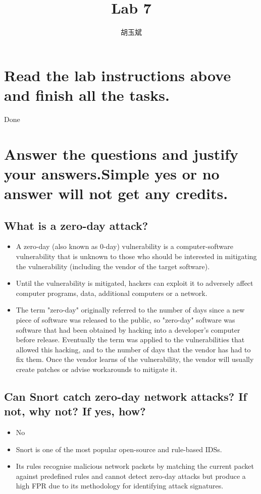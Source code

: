 \documentclass[onecolumn,oneside]{SUSTechHomework}
\author{胡玉斌}
\title{Lab 7}
\begin{document}
  \maketitle

  \section{Read the lab instructions above and finish all the tasks.}

  Done

  \section{Answer the questions and justify your answers.Simple yes or no answer will not get any credits.}

    \subsection{What is a zero-day attack?}

    \begin{itemize}
      \item A zero-day (also known as 0-day) vulnerability is a computer-software vulnerability that is unknown to those who should be interested in mitigating the vulnerability (including the vendor of the target software).
      \item Until the vulnerability is mitigated, hackers can exploit it to adversely affect computer programs, data, additional computers or a network.
      \item The term "zero-day" originally referred to the number of days since a new piece of software was released to the public, so "zero-day" software was software that had been obtained by hacking into a developer's computer before release. Eventually the term was applied to the vulnerabilities that allowed this hacking, and to the number of days that the vendor has had to fix them. Once the vendor learns of the vulnerability, the vendor will usually create patches or advise workarounds to mitigate it.
    \end{itemize}

    \subsection{Can Snort catch zero-day network attacks? If not, why not? If yes, how?}

      \begin{itemize}
        \item No
        \item Snort is one of the most popular open-source and rule-based IDSs.
        \item Its rules recognise malicious network packets by matching the current packet against predefined rules and cannot detect zero-day attacks but produce a high FPR due to its methodology for identifying attack signatures.
      \end{itemize}
\end{document}
